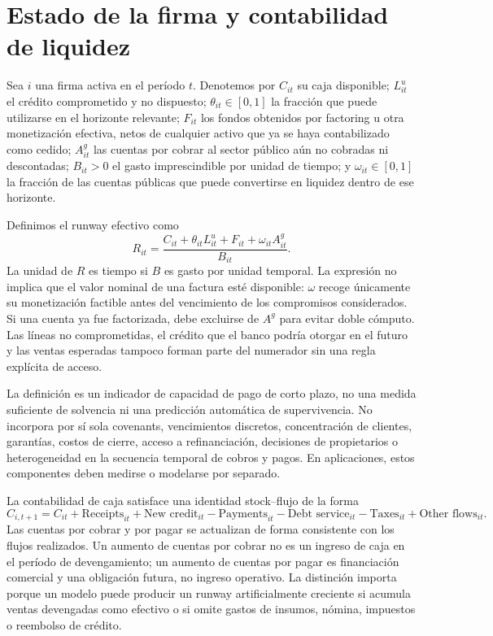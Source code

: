 \documentclass[11pt,a4paper]{article}
\begin{document}
\section{Estado de la firma y contabilidad de liquidez}
Sea $i$ una firma activa en el período $t$. Denotemos por $C_{it}$ su caja disponible; $L^u_{it}$ el crédito comprometido y no dispuesto; $\theta_{it}\in[0,1]$ la fracción que puede utilizarse en el horizonte relevante; $F_{it}$ los fondos obtenidos por factoring u otra monetización efectiva, netos de cualquier activo que ya se haya contabilizado como cedido; $A^{g}_{it}$ las cuentas por cobrar al sector público aún no cobradas ni descontadas; $B_{it}>0$ el gasto imprescindible por unidad de tiempo; y $\omega_{it}\in[0,1]$ la fracción de las cuentas públicas que puede convertirse en liquidez dentro de ese horizonte.

Definimos el runway efectivo como
\begin{equation}
R_{it}=\frac{C_{it}+\theta_{it}L^u_{it}+F_{it}+\omega_{it}A^g_{it}}{B_{it}}. \label{eq:runway}
\end{equation}
La unidad de $R$ es tiempo si $B$ es gasto por unidad temporal. La expresión no implica que el valor nominal de una factura esté disponible: $\omega$ recoge únicamente su monetización factible antes del vencimiento de los compromisos considerados. Si una cuenta ya fue factorizada, debe excluirse de $A^g$ para evitar doble cómputo. Las líneas no comprometidas, el crédito que el banco podría otorgar en el futuro y las ventas esperadas tampoco forman parte del numerador sin una regla explícita de acceso.

La definición es un indicador de capacidad de pago de corto plazo, no una medida suficiente de solvencia ni una predicción automática de supervivencia. No incorpora por sí sola covenants, vencimientos discretos, concentración de clientes, garantías, costos de cierre, acceso a refinanciación, decisiones de propietarios o heterogeneidad en la secuencia temporal de cobros y pagos. En aplicaciones, estos componentes deben medirse o modelarse por separado.

La contabilidad de caja satisface una identidad stock--flujo de la forma
\begin{equation}
C_{i,t+1}=C_{it}+\text{Receipts}_{it}+\text{New credit}_{it}-\text{Payments}_{it}-\text{Debt service}_{it}-\text{Taxes}_{it}+\text{Other flows}_{it}. \label{eq:cashflow}
\end{equation}
Las cuentas por cobrar y por pagar se actualizan de forma consistente con los flujos realizados. Un aumento de cuentas por cobrar no es un ingreso de caja en el período de devengamiento; un aumento de cuentas por pagar es financiación comercial y una obligación futura, no ingreso operativo. La distinción importa porque un modelo puede producir un runway artificialmente creciente si acumula ventas devengadas como efectivo o si omite gastos de insumos, nómina, impuestos o reembolso de crédito.
\end{document}
